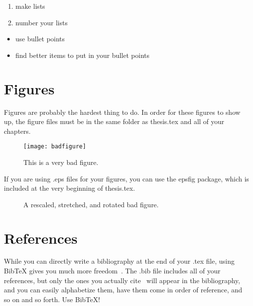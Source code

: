 \begin{enumerate}

\item make lists

\item number your lists

\end{enumerate}

\begin{itemize}

\item use bullet points

\item find better items to put in your bullet points

\end{itemize}

\section{Figures}

Figures are probably the hardest thing to do.  In order for these figures to show up, the figure files must be in the same folder as thesis.tex and all of your chapters.  

\begin{figure}[htbp] %
  \centering
  \texttt{[image: badfigure]}
  \caption{This is a very bad figure.}
  \label{fig:badfigure}
\end{figure}

If you are using .eps files for your figures, you can use the epsfig package, which is included at the very beginning of thesis.tex.
\begin{figure}[h]
\begin{center}
\end{center}
\caption{A rescaled, stretched, and rotated bad figure.}
\end{figure}

\section{References}
While you can directly write a bibliography at the end of your .tex file, using BibTeX gives you much more freedom~\cite{chang2006}.  The .bib file includes all of your references, but only the ones you actually cite~\cite{JelezkoPrivate, Inui, Ernst, Ta} will appear in the bibliography, and you can easily alphabetize them, have them come in order of reference, and so on and so forth.  Use BibTeX!


